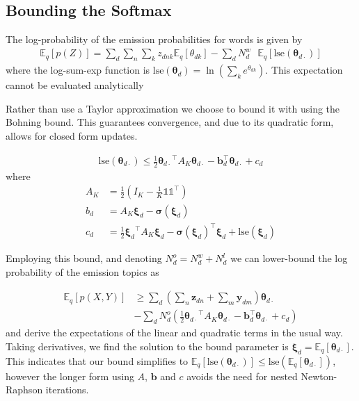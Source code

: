 \documentclass{sciposter}
\newcommand \ex[2] {
    \mathbb{E}_{ { #2 } }\left[ #1 \right]
}
\newcommand \halve[1] {
	\frac{#1}{2}
}
\newcommand \half {
    \halve{1}
}
\newcommand \T { ^\top }
\newcommand \vv[1] { \bm #1 }
\newcommand \Ed {{ \vv{\xi}_d}}
\newcommand \zdnk[0] { { z_{dnk} } }
\newcommand \thd[0]  { { \vv \theta_d } }
\newcommand \thdk[0] { { \theta_{dk} } }
\newcommand \one  {{  \mathds{1} }}
\newcommand \lse { \text{lse} }
\newcommand \thdo { { \vv{\theta}_{d\cdot} } }
\begin{document}
\begin{multicols}{3}
\section{Bounding the Softmax}
The log-probability of the emission probabilities for words is given by
\begin{align*}
\ex{p(Z)}{q} = \sum_d \sum_n \sum_k \zdnk \ex{\thdk}{q} - \sum_d N^w_d \text{ }\ex{\lse(\thdo)}{q}
\end{align*}
where the log-sum-exp function is $\lse(\thd) = \ln (\sum_k e^\thdk)$. This expectation cannot be evaluated analytically

Rather than use a Taylor approximation\cite{Wang2013} we choose to bound it with using the Bohning bound\cite{Bohning1988}. This guarantees convergence, and due to its quadratic form, allows for closed form updates.

\begin{align*}
\lse(\thdo) \leq \half \thdo\T A_K \thdo - \vv{b}_d\T\thdo + c_d \label{eqn:lse-def}
\end{align*}
where
\begin{align*}
A_K & = \half \left( I_K - \frac{1}{K} \one \one\T \right) \\
b_d & = A_K \Ed - \vv{\sigma}(\Ed)  \\
c_d & = \frac{1}{2} \Ed\T A_K \Ed - \vv{\sigma}(\Ed)\T\Ed + \lse(\Ed)
\end{align*}

Employing this bound, and denoting $N^o_d = N^w_d + N^l_d$ we can lower-bound the log probability of the emission topics as

\begin{equation*}
\begin{aligned}
\ex{p(X,Y)}{q} & \geq \sum_d  (\sum_n \vv{z}_{dn} + \sum_m \vv{y}_{dm}) \thdo \\
   & - \sum_d N^o_d \left(\half \thdo\T A_K \thdo - \vv{b}_d\T\thdo + c_d\right)
\end{aligned}
\end{equation*}
and derive the expectations of the linear and quadratic terms in the usual way.\\

Taking derivatives, we find the solution to the bound parameter is $\Ed = \ex{\thdo}{q}$. This indicates that our bound simplifies to $\ex{\lse(\thdo)}{q} \leq \lse(\ex{\thdo}{q})$, however the longer form using $A$, $\vv{b}$ and $c$ avoids the need for nested Newton-Raphson iterations.\\


\end{multicols}
\end{document}
